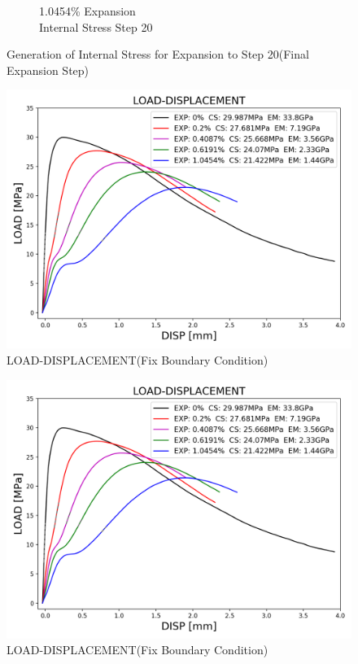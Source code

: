 \begin{figure}[ht!]
\begin{subfigure}{.25\textwidth}
      \caption{1.0454\% Expansion\\Internal Stress Step 20}
    \end{subfigure}

\caption{Generation of Internal Stress for Expansion to Step 20(Final Expansion Step)}
\label{fig:A30_stress}
\end{figure}

\begin{figure}[ht!]
    \centering
    \includegraphics[width=0.8\linewidth]{Files/exp_3D/DEF/S13A30FIXX-1-LOAD-DISPLACEMENT.png}
    \caption{LOAD-DISPLACEMENT(Fix Boundary Condition)}
    \label{fig:S13A30FIXX-1-LOAD-DISPLACEMENT}
\end{figure}


\begin{figure}[ht!]
    \centering
    \includegraphics[width=0.8\linewidth]{Files/exp_3D/DEF/S13A30FIXX-1-LOAD-DISPLACEMENT.png}
    \caption{LOAD-DISPLACEMENT(Fix Boundary Condition)}
    \label{fig:S13A30X-1CFIX-LOAD-DISPLACEMENT}
\end{figure}

